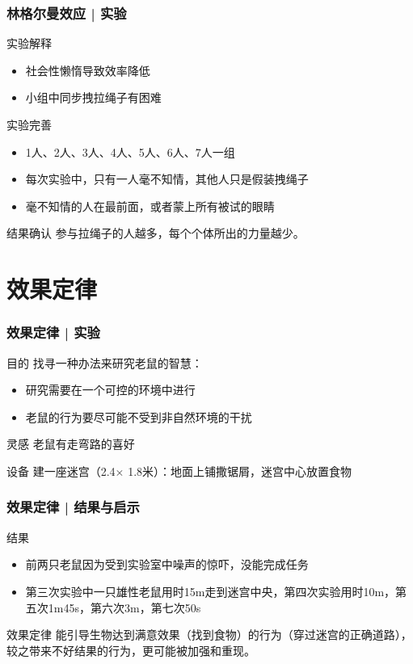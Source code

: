 \begin{frame}
  \frametitle{林格尔曼效应 | 实验}
  \begin{block}{实验解释}
    \begin{itemize}
      \item 社会性懒惰导致效率降低
      \item 小组中同步拽拉绳子有困难
    \end{itemize}
  \end{block}
  \pause
  \begin{block}{实验完善}
    \begin{itemize}
      \item 1人、2人、3人、4人、5人、6人、7人一组
      \item 每次实验中，只有一人毫不知情，其他人只是假装拽绳子
      \item 毫不知情的人在最前面，或者蒙上所有被试的眼睛
    \end{itemize}
  \end{block}
  \pause
  \begin{block}{结果确认}
    参与拉绳子的人越多，每个个体所出的力量越少。
  \end{block}
\end{frame}

\section{效果定律}
\begin{frame}
  \frametitle{效果定律 | 实验}
  \begin{block}{目的}
    找寻一种办法来研究老鼠的智慧：
    \begin{itemize}
      \item 研究需要在一个可控的环境中进行
      \item 老鼠的行为要尽可能不受到非自然环境的干扰
    \end{itemize}
  \end{block}
  \pause
  \begin{block}{灵感}
    老鼠有走弯路的喜好
  \end{block}
  \pause
  \begin{block}{设备}
    建一座迷宫（2.4$\times$ 1.8米）：地面上铺撒锯屑，迷宫中心放置食物
  \end{block}
\end{frame}

\begin{frame}
  \frametitle{效果定律 | 结果与启示}
  \begin{block}{结果}
    \begin{itemize}
      \item 前两只老鼠因为受到实验室中噪声的惊吓，没能完成任务
      \item 第三次实验中一只雄性老鼠用时15m走到迷宫中央，第四次实验用时10m，第五次1m45s，第六次3m，第七次50s
    \end{itemize}
  \end{block}
  \pause
  \begin{block}{效果定律}
    能引导生物达到满意效果（找到食物）的行为（穿过迷宫的正确道路），较之带来不好结果的行为，更可能被加强和重现。
  \end{block}
\end{frame}

